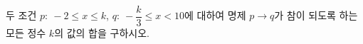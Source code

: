 두 조건 $p:\ -2\le x\le k$, $q:\ -\dfrac{k}{3}\le x<10$에 대하여 명제 $p\longrightarrow q$가 참이 되도록 하는 모든 정수 $k$의 값의 합을 구하시오. 
